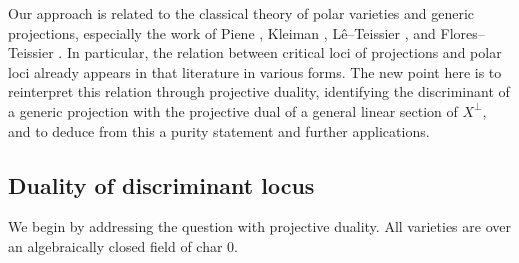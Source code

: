 \documentclass[12pt]{amsart}
\begin{document}
Our approach is related to the classical theory of polar varieties and generic projections, especially the work of Piene \cite{Pie78}, Kleiman \cite{Kle86}, Lê--Teissier \cite{LeTeissier88}, and Flores--Teissier \cite{FT18}. In particular, the relation between critical loci of projections and polar loci already appears in that literature in various forms.
The new point here is to reinterpret this relation through projective duality, identifying the discriminant of a generic projection with the projective dual of a general linear section of $X^\perp$, and to deduce from this a purity statement and further applications.



\subsection{Duality of discriminant locus}
We begin by addressing the question with projective duality. 
All varieties are over an algebraically closed field of char $0$.%
\end{document}
